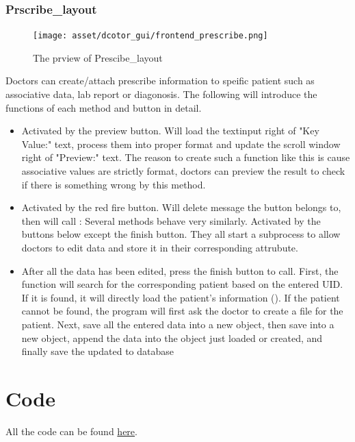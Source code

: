 \documentclass{article}
\begin{document}
\subsubsection*{Prscribe_layout}
\begin{figure}[h]
  \centering
  \texttt{[image: asset/dcotor\_gui/frontend\_prescribe.png]}
  \caption{The prview of Prescibe_layout}
  \label{fig:frontend_prescribe}
\end{figure}

Doctors can create/attach prescribe information to speific patient such as associative data, lab report or diagonosis. The following will introduce the functions of each method and button in detail.

\begin{itemize}
  \item {} Activated by the preview button. Will load the textinput right of "Key Value:" text, process them into proper format and update the scroll window right of "Preview:" text. The reason to create such a function like this is cause associative values are strictly format, doctors can preview the result to check if there is something wrong by this method.
  \item {} Activated by the red fire button. Will delete message the button belongs to, then will call : Several methods behave very similarly. Activated by the buttons below except the finish button. They all start a subprocess to allow doctors to edit data and store it in their corresponding attrubute.
  \item {} After all the data has been edited, press the finish button to call. First, the function will search for the corresponding patient based on the entered UID. If it is found, it will directly load the patient's information (). If the patient cannot be found, the program will first ask the doctor to create a file for the patient. Next, save all the entered data into a new  object, then save  into a new  object, append the data into the  object just loaded or created, and finally save the updated  to database
\end{itemize}

\section{Code}
\label{sec:code}
All the code can be found \href{https://github.com/OEmiliatanO/E-health}{here}.
\end{document}
